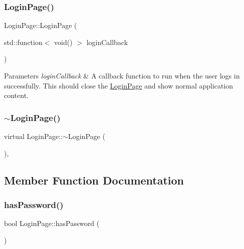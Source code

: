 \subsubsection{\texorpdfstring{Login\+Page()}{LoginPage()}}
{\footnotesize\ttfamily Login\+Page\+::\+Login\+Page (\begin{DoxyParamCaption}\item[{std\+::function$<$ void() $>$}]{login\+Callback }\end{DoxyParamCaption})}


\begin{DoxyParams}{Parameters}
{\em login\+Callback} & A callback function to run when the user logs in successfully. This should close the \mbox{\hyperlink{classLoginPage}{Login\+Page}} and show normal application content. \\
\hline
\end{DoxyParams}
\mbox{\label{classLoginPage_a6e2983811bf0dc3959e5b5075ebc58f1}} 
\subsubsection{\texorpdfstring{$\sim$\+Login\+Page()}{~LoginPage()}}
{\footnotesize\ttfamily virtual Login\+Page\+::$\sim$\+Login\+Page (\begin{DoxyParamCaption}{ }\end{DoxyParamCaption})\hspace{0.3cm}{\ttfamily [inline]}, {\ttfamily [virtual]}}



\subsection{Member Function Documentation}
\mbox{\label{classLoginPage_a12a46438d10e435351865223034db9fa}} 
\subsubsection{\texorpdfstring{has\+Password()}{hasPassword()}}
{\footnotesize\ttfamily bool Login\+Page\+::has\+Password (\begin{DoxyParamCaption}{ }\end{DoxyParamCaption})\hspace{0.3cm}{\ttfamily [virtual]}}

